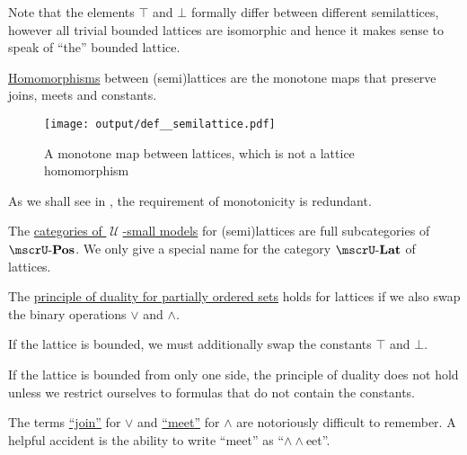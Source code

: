 \begin{definition}
\begin{thmenum}[resume=def:semilattice]
    Note that the elements \( \top \) and \( \bot \) formally differ between different semilattices, however all trivial bounded lattices are isomorphic and hence it makes sense to speak of \enquote{the} bounded lattice.

     \hyperref[def:first_order_homomorphism]{Homomorphisms} between (semi)lattices are the monotone maps that preserve joins, meets and constants.

    \begin{figure}
      \centering
      \texttt{[image: output/def\_\_semilattice.pdf]}
      \caption{A monotone map between lattices, which is not a lattice homomorphism}
      \label{fig:def:semilattice/homomorphism/monotone_map_not_homomorphism}
    \end{figure}

    As we shall see in , the requirement of monotonicity is redundant.

     The \hyperref[def:category_of_small_first_order_models]{categories of \( \mscrU \)-small models} for (semi)lattices are full subcategories of \hyperref[def:partially_ordered_set/category]{\( \ucat{Pos} \)}. We only give a special name for the category \( \ucat{Lat} \) of lattices.

     The \hyperref[def:partially_ordered_set/duality]{principle of duality for partially ordered sets} holds for lattices if we also swap the binary operations \( \vee \) and \( \wedge \).

    If the lattice is bounded, we must additionally swap the constants \( \top \) and \( \bot \).

    If the lattice is bounded from only one side, the principle of duality does not hold unless we restrict ourselves to formulas that do not contain the constants.
  \end{thmenum}
\end{definition}

\begin{remark}\label{rem:lattice_operation_etymology}
  The terms \hyperref[def:semilattice/join]{\enquote{join}} for \( \vee \) and \hyperref[def:semilattice/meet]{\enquote{meet}} for \( \wedge \) are notoriously difficult to remember. A helpful accident is the ability to write \enquote{meet} as \enquote{\( \wedge \wedge \)eet}.
\end{remark}

